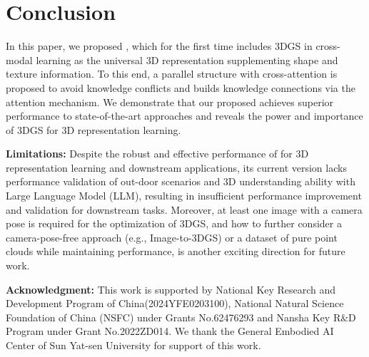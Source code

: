 \vspace{-3mm}
\section{Conclusion}
\label{sec:conclusion}

In this paper, we proposed \name{}, which for the first time includes 3DGS in cross-modal learning as the universal 3D representation supplementing shape and texture information. To this end, a parallel structure with cross-attention is proposed to avoid knowledge conflicts and builds knowledge connections via the attention mechanism.
We demonstrate that our proposed \name{} achieves superior performance to state-of-the-art approaches and reveals the power and importance of 3DGS for 3D representation learning. 

\textbf{Limitations:} Despite the robust and effective performance of \name{} for 3D representation learning and downstream applications, its current version lacks performance validation of out-door scenarios and 3D understanding ability with Large Language Model (LLM), resulting in insufficient performance improvement and validation for downstream tasks. 
%
Moreover, at least one image with a camera pose is required for the optimization of 3DGS, and how to further consider a camera-pose-free approach (e.g., Image-to-3DGS) or a dataset of pure point clouds while maintaining performance, is another exciting direction for future work.

\textbf{Acknowledgment:} This work is supported by National Key Research and Development Program of China(2024YFE0203100), National Natural Science Foundation of China (NSFC) under Grants No.62476293 and Nansha Key R$\&$D Program under Grant No.2022ZD014. We thank the General Embodied AI Center of Sun Yat-sen University for support of this work.
